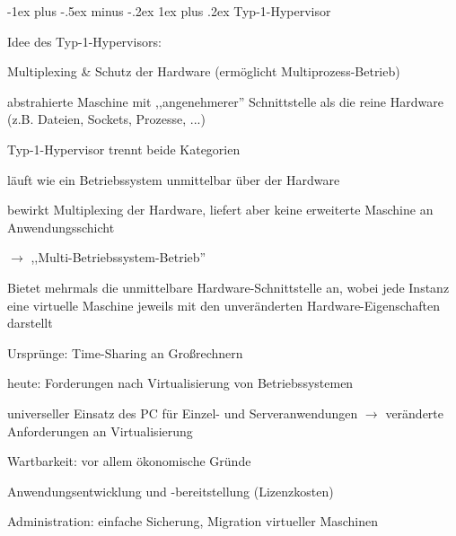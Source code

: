 \documentclass[a4paper]{article}
\makeatletter
\renewcommand{\subsubsection}{\@startsection{subsubsection}{3}{0mm}%
 {-1ex plus -.5ex minus -.2ex}%
 {1ex plus .2ex}%
 {\normalfont\small\bfseries}}
\makeatother
\begin{document}
\begin{multicols}{3}
    \subsubsection{Typ-1-Hypervisor}
    \begin{itemize*}
        \item Idee des Typ-1-Hypervisors:
        \begin{itemize*}
            \item Multiplexing \& Schutz der Hardware (ermöglicht Multiprozess-Betrieb)
            \item abstrahierte Maschine mit ,,angenehmerer'' Schnittstelle als die reine Hardware (z.B. Dateien, Sockets, Prozesse, ...)
        \end{itemize*}
        \item Typ-1-Hypervisor trennt beide Kategorien
        \begin{itemize*}
            \item läuft wie ein Betriebssystem unmittelbar über der Hardware
            \item bewirkt Multiplexing der Hardware, liefert aber keine erweiterte Maschine an Anwendungsschicht
            \item[$\rightarrow$] ,,Multi-Betriebssystem-Betrieb''
        \end{itemize*}
        \item Bietet mehrmals die unmittelbare Hardware-Schnittstelle an, wobei jede Instanz eine virtuelle Maschine jeweils mit den unveränderten Hardware-Eigenschaften darstellt %
        \item Ursprünge: Time-Sharing an Großrechnern
        \item heute: Forderungen nach Virtualisierung von Betriebssystemen
        \begin{itemize*}
            \item universeller Einsatz des PC für Einzel- und Serveranwendungen $\rightarrow$ veränderte Anforderungen an Virtualisierung
            \item Wartbarkeit: vor allem ökonomische Gründe
            \begin{enumerate*}
                \item Anwendungsentwicklung und -bereitstellung (Lizenzkosten)
                \item Administration: einfache Sicherung, Migration virtueller Maschinen

\end{enumerate*}
\end{itemize*}
\end{itemize*}
\end{multicols}
\end{document}
